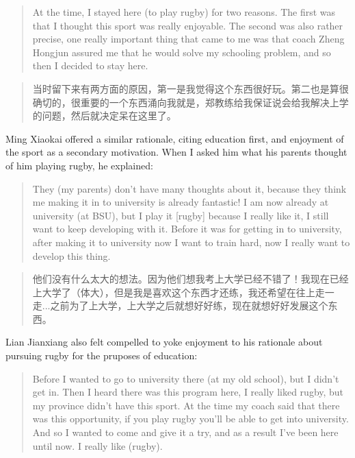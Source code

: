 \begin{CJK}{UTF8}{gbsn}
    \begin{quote}
      At the time, I stayed here (to play rugby) for two reasons.  The first was that I thought this sport was really enjoyable. The second was also rather precise, one really important thing that came to me was that coach Zheng Hongjun assured me that he would solve my schooling problem, and so then I decided to stay here.
    \end{quote}

    \begin{quote}
      当时留下来有两方面的原因，第一是我觉得这个东西很好玩。第二也是算很确切的，很重要的一个东西涌向我就是，郑教练给我保证说会给我解决上学的问题，然后就决定呆在这里了。 
    \end{quote}

Ming Xiaokai offered a similar rationale, citing education first, and enjoyment of the sport as a secondary motivation.  When I asked him what his parents thought of him playing rugby, he explained:

    \begin{quote}
      They (my parents) don't have many thoughts about it, because they think me making it in to university is already fantastic! I am now already at university (at BSU), but I play it [rugby] because I really like it, I still want to keep developing with it. Before it was for getting in to university, after making it to university now I want to train hard, now I really want to develop this thing.
    \end{quote}

    \begin{quote}
      他们没有什么太大的想法。因为他们想我考上大学已经不错了！我现在已经上大学了（体大），但是我是喜欢这个东西才还练，我还希望在往上走一走...之前为了上大学，上大学之后就想好好练，现在就想好好发展这个东西。
    \end{quote}

Lian Jianxiang also felt compelled to yoke enjoyment to his rationale about pursuing rugby for the pruposes of education:

    \begin{quote}
        Before I wanted to go to university there (at my old school), but I didn't get in.  Then I heard there was this program here, I really liked rugby, but my province didn't have this sport. At the time my coach said that there was this opportunity, if you play rugby you'll be able to get into university.  And so I wanted to come and give it a try, and as a result I've been here until now.  I really like (rugby).
    \end{quote}


\end{CJK}
